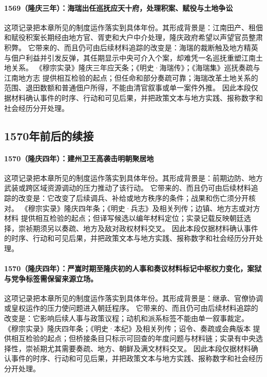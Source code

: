 \paragraph{1569（隆庆三年）：海瑞出任巡抚应天十府，处理积案、赋役与土地争讼} 这项记录把本章所见的制度运作落实到具体年份。其形成背景是：江南田产、租佃和赋役积案长期经由地方官、胥吏和大户中介处理，隆庆政府希望以声望官员整肃积弊。 它带来的、而且仍可由后续材料追踪的改变是：海瑞的裁断触及地方精英与佃户利益并引发反弹，其任期显示中央可介入个案，却难凭一名巡抚重塑江南土地关系。 《穆宗实录》隆庆三年应天条；《明史·海瑞传》；《海瑞集》巡抚奏疏与江南地方志 提供相互检验的起点；但任命和部分奏疏可靠；海瑞改革土地关系的范围、退田数额和普通佃户所得，不能由清官叙事或单一案件外推。 因此本段仅据材料确认事件的时序、行动和可见后果，并把政策文本与地方实践、报称数字和社会经历分开处理。

\subsection{1570年前后的续接}

\paragraph{1570（隆庆四年）：建州卫王高袭击明朝聚居地} 这项记录把本章所见的制度运作落实到具体年份。其形成背景是：前期边防、地方武装或跨区域资源调动的压力推动了该行动。 它带来的、而且仍可由后续材料追踪的改变是：它改变了后续调兵、补给或地方秩序的条件；战果和伤亡须分开核对。 《穆宗实录》隆庆四年条；《明史·兵志》及相关列传；边镇、地方志或对方材料 提供相互检验的起点；但译写候选以编年材料定位；实录记载反映朝廷选择，崇祯期须另以奏疏、地方及敌对政权材料交叉。 因此本段仅据材料确认事件的时序、行动和可见后果，并把政策文本与地方实践、报称数字和社会经历分开处理。

\paragraph{1570（隆庆四年）：严嵩时期至隆庆初的人事和奏议材料标记中枢权力变化，案狱与党争标签需保留来源立场。} 这项记录把本章所见的制度运作落实到具体年份。其形成背景是：继承、官僚协调或皇权运作的压力使问题进入朝廷程序。 它带来的、而且仍可由后续材料追踪的改变是：它影响后续人事与政策议程；动机和派系标签不能由单一叙事裁定。 《穆宗实录》隆庆四年条；《明史·本纪》及相关列传；诏令、奏疏或会典版本 提供相互检验的起点；但桥接条目只标示可回查的年度问题与材料链；实录有中央选择性，崇祯期尤其需要奏疏、地方、朝鲜及满文材料交叉。 因此本段仅据材料确认事件的时序、行动和可见后果，并把政策文本与地方实践、报称数字和社会经历分开处理。

